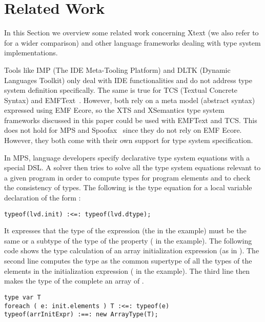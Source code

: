 \section{Related Work}
\label{sec:related}

In this Section we overview some related work
concerning Xtext (we also refer to \cite{PP08} for a wider comparison)
and other language frameworks dealing with type system implementations.

\newcommand{\xtypes}{XTypeS}
\newcommand{\xtext}{Xtext}

Tools like IMP (The IDE Meta-Tooling Platform) \cite{imp09} and DLTK (Dynamic
Languages Toolkit) \cite{DLTK} only deal with IDE functionalities and do not
address type system definition specifically. 
The same is true for TCS (Textual Concrete Syntax) \cite{tcs}  
and EMFText~\cite{emftext09}. However, both rely on a meta model (abstract
syntax) expressed using EMF Ecore, so the XTS and XSemantics type system
frameworks discussed in this paper could be used with EMFText and TCS. 
This does not hold for MPS \cite{MPS} and Spoofax~\cite{Spoofax2010}
since they do not rely on EMF Ecore. However, they both come with their own
support for type system specification.

In MPS, language developers specify declarative type system equations with a
special DSL. A solver then tries to solve all the type system equations relevant
to a given program in order to compute types for program elements and to check
the consistency of types. The following is the type equation for a local
variable declaration of the form :

\begin{lstlisting}[language=MPS]
typeof(lvd.init) :<=: typeof(lvd.dtype);
\end{lstlisting}

\noindent
It expresses that the type of the  expression (the  in the
example) must be the same or a subtype of the type of the  property
( in the example). The following code shows the type calculation of an
array initialization expression (as in ). The second line
computes the type  as the common supertype of all the types of the
elements in the initialization expression ( in the example). The third
line then makes the type of the complete  an array of .

\begin{lstlisting}[language=MPS]
type var T
foreach ( e: init.elements ) T :<=: typeof(e)
typeof(arrInitExpr) :==: new ArrayType(T);
\end{lstlisting}

